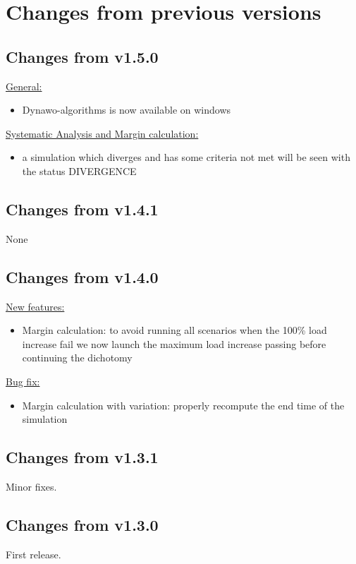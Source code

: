 \documentclass[a4paper, 12pt]{report}
\begin{document}
\section{Changes from previous versions}

\subsection{Changes from v1.5.0}
\underline{General:}

\begin{itemize}
\item Dynawo-algorithms is now available on windows
\end{itemize}

\underline{Systematic Analysis and Margin calculation:}

\begin{itemize}
\item a simulation which diverges and has some criteria not met will be seen with the status DIVERGENCE
\end{itemize}

\subsection{Changes from v1.4.1}
None

\subsection{Changes from v1.4.0}

\underline{New features:}
\begin{itemize}
\item Margin calculation: to avoid running all scenarios when the 100\% load increase fail we now launch the maximum load increase passing before continuing the dichotomy
\end{itemize}

\underline{Bug fix:}
\begin{itemize}
\item Margin calculation with variation: properly recompute the end time of the simulation
\end{itemize}

\subsection{Changes from v1.3.1}
Minor fixes.

\subsection{Changes from v1.3.0}
First release.
\end{document}
